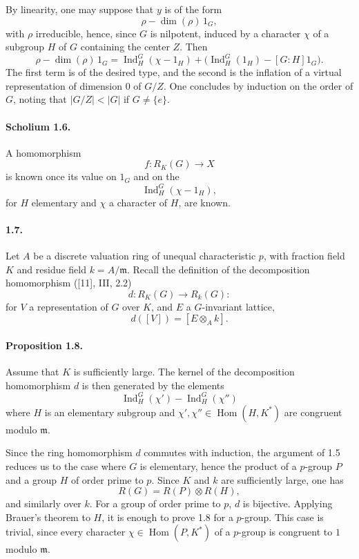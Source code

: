 \documentclass[10pt]{article}
\newcommand{\Hom}{\operatorname{Hom}}
\newcommand{\Ind}{\operatorname{Ind}}
\begin{document}
By linearity, one may suppose that \(y\) is of the form
\[
\rho-\dim(\rho)\,1_G,
\]
with \(\rho\) irreducible, hence, since \(G\) is nilpotent, induced by a character \(\chi\) of a subgroup \(H\) of \(G\) containing the center \(Z\). Then
\[
\rho-\dim(\rho)\,1_G
=
\Ind_H^G(\chi-1_H)+\bigl(\Ind_H^G(1_H)-[G:H]1_G\bigr).
\]
The first term is of the desired type, and the second is the inflation of a virtual representation of dimension \(0\) of \(G/Z\). One concludes by induction on the order of \(G\), noting that \(|G/Z|<|G|\) if \(G\ne\{e\}\).

\paragraph{Scholium 1.6.} A homomorphism
\[
f:R_K(G)\longrightarrow X
\]
is known once its value on \(1_G\) and on the
\[
\Ind_H^G(\chi-1_H),
\]
for \(H\) elementary and \(\chi\) a character of \(H\), are known.

\paragraph{1.7.} Let \(A\) be a discrete valuation ring of unequal characteristic \(p\), with fraction field \(K\) and residue field \(k=A/\mathfrak m\). Recall the definition of the decomposition homomorphism ([11], III, 2.2)
\[
d:R_K(G)\longrightarrow R_k(G):
\]
for \(V\) a representation of \(G\) over \(K\), and \(E\) a \(G\)-invariant lattice,
\[
d([V])=[E\otimes_Ak].
\]




\paragraph{Proposition 1.8.} Assume that \(K\) is sufficiently large. The kernel of the decomposition homomorphism \(d\) is then generated by the elements
\[
\Ind_H^G(\chi')-\Ind_H^G(\chi'')
\]
where \(H\) is an elementary subgroup and \(\chi',\chi''\in\Hom(H,K^*)\) are congruent modulo \(\mathfrak m\).

Since the ring homomorphism \(d\) commutes with induction, the argument of 1.5 reduces us to the case where \(G\) is elementary, hence the product of a \(p\)-group \(P\) and a group \(H\) of order prime to \(p\). Since \(K\) and \(k\) are sufficiently large, one has
\[
R(G)=R(P)\otimes R(H),
\]
and similarly over \(k\). For a group of order prime to \(p\), \(d\) is bijective. Applying Brauer's theorem to \(H\), it is enough to prove 1.8 for a \(p\)-group. This case is trivial, since every character \(\chi\in\Hom(P,K^*)\) of a \(p\)-group is congruent to \(1\) modulo \(\mathfrak m\).
\end{document}
